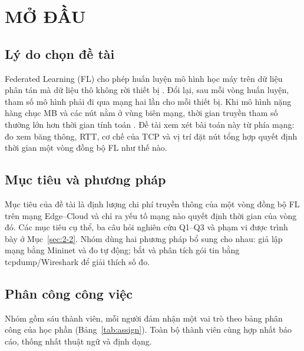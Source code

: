 \section*{\centering MỞ ĐẦU}

\subsection*{Lý do chọn đề tài}
Federated Learning (FL) cho phép huấn luyện mô hình học máy trên dữ liệu phân tán mà dữ liệu thô không rời thiết bị \cite{mcmahan2017fedavg}. Đổi lại, sau mỗi vòng huấn luyện, tham số mô hình phải đi qua mạng hai lần cho mỗi thiết bị. Khi mô hình nặng hàng chục MB và các nút nằm ở vùng biên mạng, thời gian truyền tham số thường lớn hơn thời gian tính toán \cite{konecny2016communication}. Đề tài xem xét bài toán này từ phía mạng: đo xem băng thông, RTT, cơ chế của TCP và vị trí đặt nút tổng hợp quyết định thời gian một vòng đồng bộ FL như thế nào.

\subsection*{Mục tiêu và phương pháp}
Mục tiêu của đề tài là định lượng chi phí truyền thông của một vòng đồng bộ FL trên mạng Edge--Cloud và chỉ ra yếu tố mạng nào quyết định thời gian của vòng đó. Các mục tiêu cụ thể, ba câu hỏi nghiên cứu Q1--Q3 và phạm vi được trình bày ở Mục~\ref{sec:2-2}. Nhóm dùng hai phương pháp bổ sung cho nhau: giả lập mạng bằng Mininet và đo tự động; bắt và phân tích gói tin bằng tcpdump/Wireshark để giải thích số đo.

\subsection*{Phân công công việc}
Nhóm gồm sáu thành viên, mỗi người đảm nhận một vai trò theo bảng phân công của học phần (Bảng~\ref{tab:assign}). Toàn bộ thành viên cùng hợp nhất báo cáo, thống nhất thuật ngữ và định dạng.

